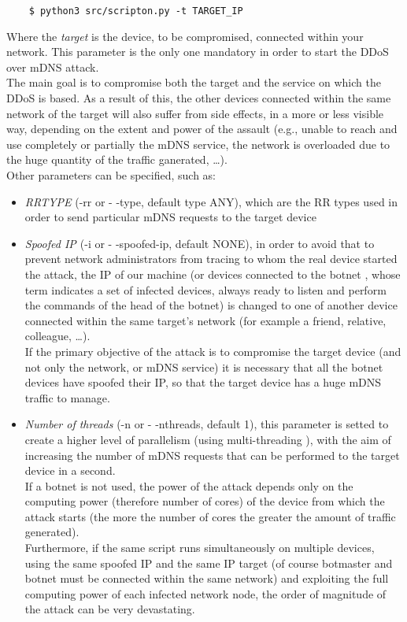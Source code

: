 \documentclass[fleqn, 10pt]{SelfArx} %
\begin{document}
\begin{scriptsize}
	\begin{verbatim}
	$ python3 src/scripton.py -t TARGET_IP 
	\end{verbatim}
\end{scriptsize}

Where the {\it{target}} is the device, to be compromised, connected within your network.
This parameter is the only one mandatory in order to start the DDoS over mDNS attack.\\
The main goal is to compromise both the target and the service on which the DDoS is based. 
As a result of this, the other devices connected within the same network of the target will 
also suffer from side effects, in a more or less visible way, depending on the extent and power of the assault
(e.g., unable to reach and use completely or partially the mDNS service, the network is overloaded due to the huge quantity of the traffic ganerated, \dots).\\
Other parameters can be specified, such as:
\begin{itemize}[leftmargin=*]
    \item {\it{RRTYPE}} (-rr or - -type, default type ANY), which are the RR types used in order to send particular mDNS requests to the target device
    \item {\it{Spoofed IP} \cite{SPOOFING}} (-i or - -spoofed-ip, default NONE), in order to avoid that to prevent network administrators from tracing to whom the real device started the attack, 
	the IP of our machine (or devices connected to the botnet \cite{BOTNET}, whose term indicates a set of infected devices, always ready to listen and perform the commands of the head of the botnet) is changed to one of another device connected within the same target's network (for example a friend, relative, colleague, \dots).\\
	If the primary objective of the attack is to compromise the target device (and not only the network, or mDNS service) it is necessary that all the botnet devices have spoofed their IP, 
	so that the target device has a huge mDNS traffic to manage.
    \item {\it{Number of threads}} (-n or - -nthreads, default 1), this parameter is setted to create a higher level of parallelism (using multi-threading \cite{THREAD}), with the aim of increasing the number of mDNS requests that can be performed to the target device in a second. \\
    If a botnet is not used, the power of the attack depends only on the computing power (therefore number of cores) of the device from which the attack starts (the more the number of cores the greater the amount of traffic generated). \\
	Furthermore, if the same script runs simultaneously on multiple devices, using the same spoofed IP and the same IP target (of course botmaster and botnet must be connected within the same network) and exploiting the full computing power of each infected network node, the order of magnitude of the attack can be very devastating.
\end{itemize}
\end{document}
